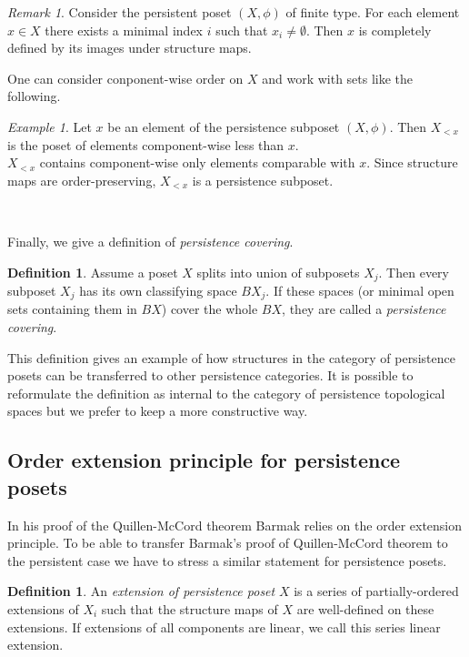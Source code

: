 \documentclass[english,12pt]{article}
\newcounter{stmcounter}[section]
\numberwithin{equation}{section}
\theoremstyle{definition}
\newtheorem{definition}[stmcounter]{Definition}
\theoremstyle{remark}
\newtheorem{remark}[stmcounter]{Remark}
\newtheorem{example}[stmcounter]{Example}
\newcommand{\define}[1]{{\textit{#1}}}
\begin{document}
\begin{remark}
  Consider the persistent poset $(X, \phi)$ of finite type. For each element $x \in X$ there exists a minimal index $i$ such that $x_i \neq \emptyset$. Then $x$ is completely defined by its images under structure maps.
\end{remark}

One can consider conponent-wise order on $X$ and work with sets like the following.
\begin{example}
  Let $x$ be an element of the persistence subposet $(X, \phi)$. Then $X_{<x}$ is the poset of elements component-wise less than $x$.\\

  $X_{<x}$ contains component-wise only elements comparable with $x$. Since structure maps are order-preserving, $X_{<x}$ is a persistence subposet.
\end{example} ~ \par

Finally, we give a definition of \define{persistence covering}.\\

\begin{definition}
  Assume a poset $X$ splits into union of subposets $X_j$. Then every subposet $X_j$ has its own classifying space $BX_j$. If these spaces (or minimal open sets containing them in $BX$) cover the whole $BX$, they are called a \define{persistence covering}.
\end{definition}

This definition gives an example of how structures in the category of persistence posets can be transferred to other persistence categories. It is possible to reformulate the definition as internal to the category of persistence topological spaces but we prefer to keep a more constructive way.


\subsection{Order extension principle for persistence posets}

In his proof of the Quillen-McCord theorem Barmak relies on the order extension principle. To be able to transfer Barmak's proof of Quillen-McCord theorem to the persistent case we have to stress a similar statement for persistence posets.

\begin{definition}
  An \define{extension of persistence poset} $X$ is a series of partially-ordered extensions of $X_i$ such that the structure maps of $X$ are well-defined on these extensions. If extensions of all components are linear, we call this series linear extension.
\end{definition}
\end{document}
